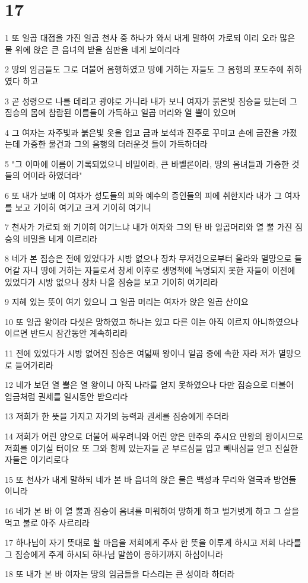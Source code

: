 \chapter{17}

\par 1 또 일곱 대접을 가진 일곱 천사 중 하나가 와서 내게 말하여 가로되 이리 오라 많은 물 위에 앉은 큰 음녀의 받을 심판을 네게 보이리라
\par 2 땅의 임금들도 그로 더불어 음행하였고 땅에 거하는 자들도 그 음행의 포도주에 취하였다 하고
\par 3 곧 성령으로 나를 데리고 광야로 가니라 내가 보니 여자가 붉은빛 짐승을 탔는데 그 짐승의 몸에 참람된 이름들이 가득하고 일곱 머리와 열 뿔이 있으며
\par 4 그 여자는 자주빛과 붉은빛 옷을 입고 금과 보석과 진주로 꾸미고 손에 금잔을 가졌는데 가증한 물건과 그의 음행의 더러운것 들이 가득하더라
\par 5 "그 이마에 이름이 기록되었으니 비밀이라, 큰 바벨론이라, 땅의 음녀들과 가증한 것들의 어미라 하였더라"
\par 6 또 내가 보매 이 여자가 성도들의 피와 예수의 증인들의 피에 취한지라 내가 그 여자를 보고 기이히 여기고 크게 기이히 여기니
\par 7 천사가 가로되 왜 기이히 여기느냐 내가 여자와 그의 탄 바 일곱머리와 열 뿔 가진 짐승의 비밀을 네게 이르리라
\par 8 네가 본 짐승은 전에 있었다가 시방 없으나 장차 무저갱으로부터 올라와 멸망으로 들어갈 자니 땅에 거하는 자들로서 창세 이후로 생명책에 녹명되지 못한 자들이 이전에 있었다가 시방 없으나 장차 나올 짐승을 보고 기이히 여기리라
\par 9 지혜 있는 뜻이 여기 있으니 그 일곱 머리는 여자가 앉은 일곱 산이요
\par 10 또 일곱 왕이라 다섯은 망하였고 하나는 있고 다른 이는 아직 이르지 아니하였으나 이르면 반드시 잠간동안 계속하리라
\par 11 전에 있었다가 시방 없어진 짐승은 여덟째 왕이니 일곱 중에 속한 자라 저가 멸망으로 들어가리라
\par 12 네가 보던 열 뿔은 열 왕이니 아직 나라를 얻지 못하였으나 다만 짐승으로 더불어 임금처럼 권세를 일시동안 받으리라
\par 13 저희가 한 뜻을 가지고 자기의 능력과 권세를 짐승에게 주더라
\par 14 저희가 어린 양으로 더불어 싸우려니와 어린 양은 만주의 주시요 만왕의 왕이시므로 저희를 이기실 터이요 또 그와 함께 있는자들 곧 부르심을 입고 빼내심을 얻고 진실한 자들은 이기리로다
\par 15 또 천사가 내게 말하되 네가 본 바 음녀의 앉은 물은 백성과 무리와 열국과 방언들이니라
\par 16 네가 본 바 이 열 뿔과 짐승이 음녀를 미워하여 망하게 하고 벌거벗게 하고 그 살을 먹고 불로 아주 사르리라
\par 17 하나님이 자기 뜻대로 할 마음을 저희에게 주사 한 뜻을 이루게 하시고 저희 나라를 그 짐승에게 주게 하시되 하나님 말씀이 응하기까지 하심이니라
\par 18 또 내가 본 바 여자는 땅의 임금들을 다스리는 큰 성이라 하더라

